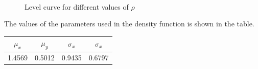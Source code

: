  \begin{figure}[!ht]
   \centering
   \quad
   \\
   \quad
   \caption{Level curve for different values of $\rho$}
   \label{Level curve}
\end{figure}
\noindent The values of the parameters used in the density function is shown in the table. 

\begin{center}
 \begin{tabular}{*{4}{c}}
\toprule
$\mu_x$ & $\mu_y$ & $\sigma_x$  & $\sigma_x$ \\
\midrule
1.4569 & 0.5012 & 0.9435 & 0.6797 \\
\bottomrule
\hline
\end{tabular}
\end{center}

